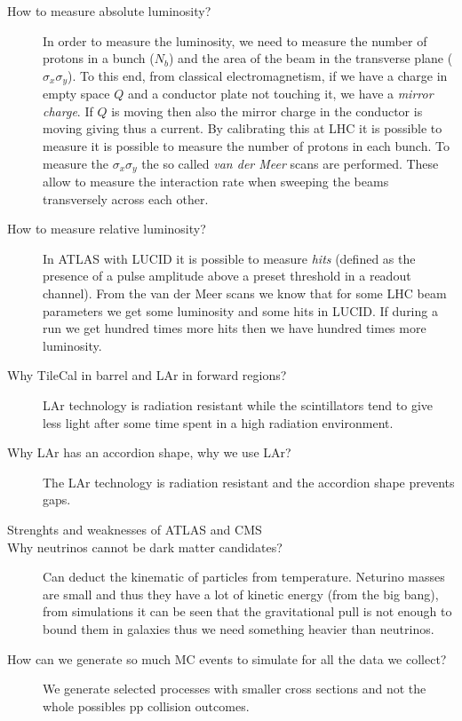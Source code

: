 \documentclass[a4paper,10pt,twoside,notitlepage]{article}
\begin{document}
\begin{description}
\item[How to measure absolute luminosity?] In order to measure the luminosity,
  we need to measure the number of protons in a bunch ($N_b$) and the area of
  the beam in the transverse plane ($\sigma_x \sigma_y$). To this end, from
  classical electromagnetism, if we have a charge in empty space $Q$ and a
  conductor plate not touching it, we have a \emph{mirror charge}. If $Q$ is
  moving then also the mirror charge in the conductor is moving giving thus a
  current. By calibrating this at LHC it is possible to measure it is possible
  to measure the number of protons in each bunch. To measure the
  $\sigma_x \sigma_y$ the so called \emph{van der Meer} scans are
  performed. These allow to measure the interaction rate when sweeping the beams
  transversely across each other.

\item[How to measure relative luminosity?] In ATLAS with LUCID it is possible to
  measure \emph{hits} (defined as the presence of a pulse amplitude above a
  preset threshold in a readout channel). From the van der Meer scans we know
  that for some LHC beam parameters we get some luminosity and some hits in
  LUCID. If during a run we get hundred times more hits then we have hundred
  times more luminosity.

\item[Why TileCal in barrel and LAr in forward regions?] LAr technology is
  radiation resistant while the scintillators tend to give less light after some
  time spent in a high radiation environment.

\item[Why LAr has an accordion shape, why we use LAr?] The LAr technology is
  radiation resistant and the accordion shape prevents gaps.

\item[Strenghts and weaknesses of ATLAS and CMS]

\item[Why neutrinos cannot be dark matter candidates?] Can deduct the kinematic
  of particles from temperature. Neturino masses are small and thus they have a
  lot of kinetic energy (from the big bang), from simulations it can be seen
  that the gravitational pull is not enough to bound them in galaxies thus we
  need something heavier than neutrinos.

\item[How can we generate so much MC events to simulate for all the data we
  collect?] We generate selected processes with smaller cross sections and not
  the whole possibles pp collision outcomes.


\end{description}
\end{document}
